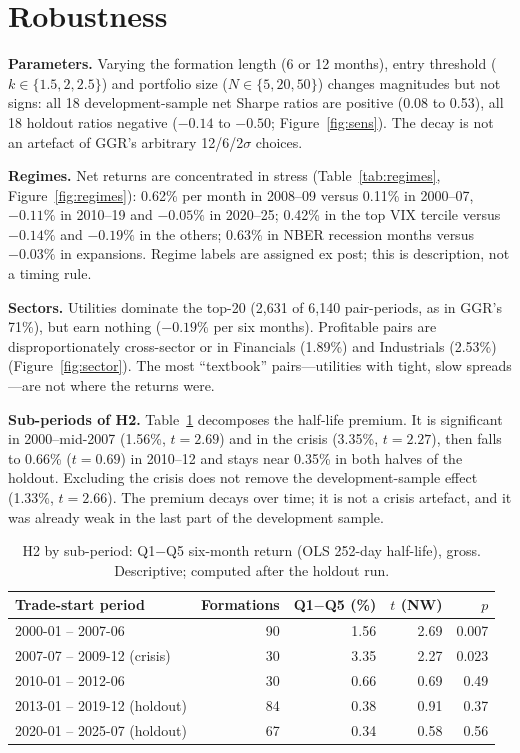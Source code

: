 \documentclass[11pt]{article}
\begin{document}
\section{Robustness}

\textbf{Parameters.} Varying the formation length (6 or 12 months), entry threshold ($k\in\{1.5,2,2.5\}$) and portfolio size ($N\in\{5,20,50\}$) changes magnitudes but not signs: all 18 development-sample net Sharpe ratios are positive (0.08 to 0.53), all 18 holdout ratios negative ($-0.14$ to $-0.50$; Figure~\ref{fig:sens}). The decay is not an artefact of GGR's arbitrary 12/6/2$\sigma$ choices.

\textbf{Regimes.} Net returns are concentrated in stress (Table~\ref{tab:regimes}, Figure~\ref{fig:regimes}): 0.62\% per month in 2008--09 versus 0.11\% in 2000--07, $-0.11\%$ in 2010--19 and $-0.05\%$ in 2020--25; 0.42\% in the top VIX tercile versus $-0.14\%$ and $-0.19\%$ in the others; 0.63\% in NBER recession months versus $-0.03\%$ in expansions. Regime labels are assigned ex post; this is description, not a timing rule.

\textbf{Sectors.} Utilities dominate the top-20 (2,631 of 6,140 pair-periods, as in GGR's 71\%), but earn nothing ($-0.19\%$ per six months). Profitable pairs are disproportionately cross-sector or in Financials (1.89\%) and Industrials (2.53\%) (Figure~\ref{fig:sector}). The most ``textbook'' pairs---utilities with tight, slow spreads---are not where the returns were.

\textbf{Sub-periods of H2.} Table~\ref{tab:sub} decomposes the half-life premium. It is significant in 2000--mid-2007 (1.56\%, $t=2.69$) and in the crisis (3.35\%, $t=2.27$), then falls to 0.66\% ($t=0.69$) in 2010--12 and stays near 0.35\% in both halves of the holdout. Excluding the crisis does not remove the development-sample effect (1.33\%, $t=2.66$). The premium decays over time; it is not a crisis artefact, and it was already weak in the last part of the development sample.

\begin{table}[t]\centering\small
\caption{H2 by sub-period: Q1$-$Q5 six-month return (OLS 252-day half-life), gross. Descriptive; computed after the holdout run.}
\label{tab:sub}
\begin{tabular}{lrrrr}
\toprule
Trade-start period & Formations & Q1$-$Q5 (\%) & $t$ (NW) & $p$ \\
\midrule
2000-01 -- 2007-06 & 90 & 1.56 & 2.69 & 0.007 \\
2007-07 -- 2009-12 (crisis) & 30 & 3.35 & 2.27 & 0.023 \\
2010-01 -- 2012-06 & 30 & 0.66 & 0.69 & 0.49 \\
2013-01 -- 2019-12 (holdout) & 84 & 0.38 & 0.91 & 0.37 \\
2020-01 -- 2025-07 (holdout) & 67 & 0.34 & 0.58 & 0.56 \\
\bottomrule
\end{tabular}
\end{table}
\end{document}

